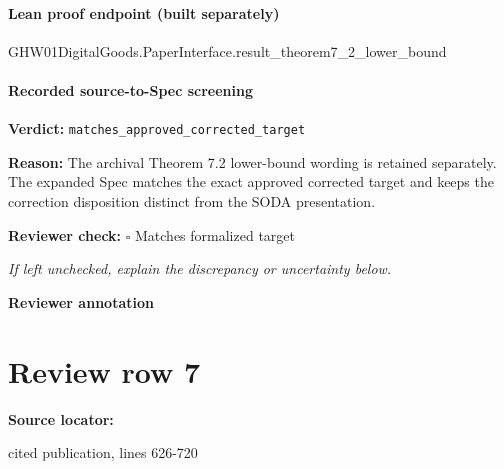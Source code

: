 \documentclass[10pt]{article}
\newcommand{\reviewerbox}{%
  \par\noindent\fbox{\parbox{0.96\linewidth}{\rule{0pt}{0.38in}}}\par
}
\newcommand{\reviewmatch}[1]{%
  \par\noindent\textbf{Reviewer check:} $\square$\; #1\par
  \noindent\emph{If left unchecked, explain the discrepancy or uncertainty below.}\par
}
\begin{document}
\paragraph{Lean proof endpoint (built separately)}\begin{ReviewVerbatim}
GHW01DigitalGoods.PaperInterface.result_theorem7_2_lower_bound
\end{ReviewVerbatim}

\paragraph{Recorded source-to-Spec screening}
\textbf{Verdict:} \texttt{matches\_approved\_corrected\_target}
\\
{\raggedright
\textbf{Reason:} The archival Theorem 7.\allowbreak{}2 lower-\allowbreak{}bound wording is retained separately.\allowbreak{} The expanded Spec matches the exact approved corrected target and keeps the correction disposition distinct from the SODA presentation.\allowbreak{}
\par}
\reviewmatch{Matches formalized target}
\noindent\textbf{Reviewer annotation}\par
\reviewerbox
\clearpage
\hypertarget{source-claim-9c375a1b7af827ba}{}
\section*{Review row 7}
\textbf{Source locator:} {\footnotesize\raggedright cited publication, lines 626-\allowbreak{}720\par}
\end{document}
